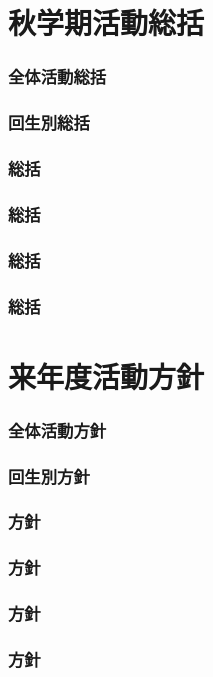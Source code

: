 \part{秋学期活動総括}
\section{全体活動総括}


\section{回生別総括}




\section{\kaisouDepartment{}総括}

\section{\kensuiDepartment{}総括}

\section{\syogaiDepartment{}総括}

\section{\systemDepartment{}総括}


\newpage
\part{来年度活動方針}
\section{全体活動方針}


\section{回生別方針}



\section{\kaisouDepartment{}方針}

\section{\kensuiDepartment{}方針}

\section{\syogaiDepartment{}方針}

\section{\systemDepartment{}方針}
